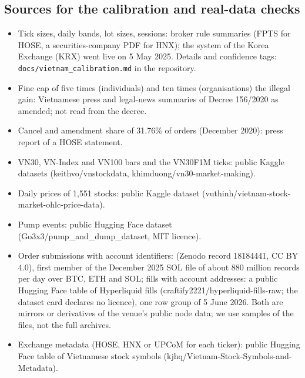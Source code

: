 \documentclass[pdflatex,sn-basic]{sn-jnl}
\theoremstyle{thmstyleone}%
\begin{document}
\begin{appendices}
\section{Sources for the calibration and real-data checks}\label{app:calib}
\begin{itemize}\itemsep0pt
\item Tick sizes, daily bands, lot sizes, sessions: broker rule summaries (FPTS for HOSE, a securities-company PDF for HNX); the system of the Korea Exchange (KRX) went live on 5 May 2025. Details and confidence tags: \texttt{docs/vietnam\_calibration.md} in the repository.
\item Fine cap of five times (individuals) and ten times (organisations) the illegal gain: Vietnamese press and legal-news summaries of Decree 156/2020 as amended; not read from the decree.
\item Cancel and amendment share of 31.76\% of orders (December 2020): press report of a HOSE statement.
\item VN30, VN-Index and VN100 bars and the VN30F1M ticks: public Kaggle datasets (keithvo/vnstockdata, khimduong/vn30-market-making).
\item Daily prices of 1,551 stocks: public Kaggle dataset (vuthinh/vietnam-stock-market-ohlc-price-data).
\item Pump events: public Hugging Face dataset (Go3x3/pump\_and\_dump\_dataset, MIT licence).
\item Order submissions with account identifiers: \citet{albers2026} (Zenodo record 18184441, CC BY 4.0), first member of the December 2025 SOL file of about 880 million records per day over BTC, ETH and SOL; fills with account addresses: a public Hugging Face table of Hyperliquid fills (craftify2221/hyperliquid-fills-raw; the dataset card declares no licence), one row group of 5 June 2026. Both are mirrors or derivatives of the venue's public node data; we use samples of the files, not the full archives.
\item Exchange metadata (HOSE, HNX or UPCoM for each ticker): public Hugging Face table of Vietnamese stock symbols (kjhq/Vietnam-Stock-Symbols-and-Metadata).
\end{itemize}


\end{appendices}
\end{document}
